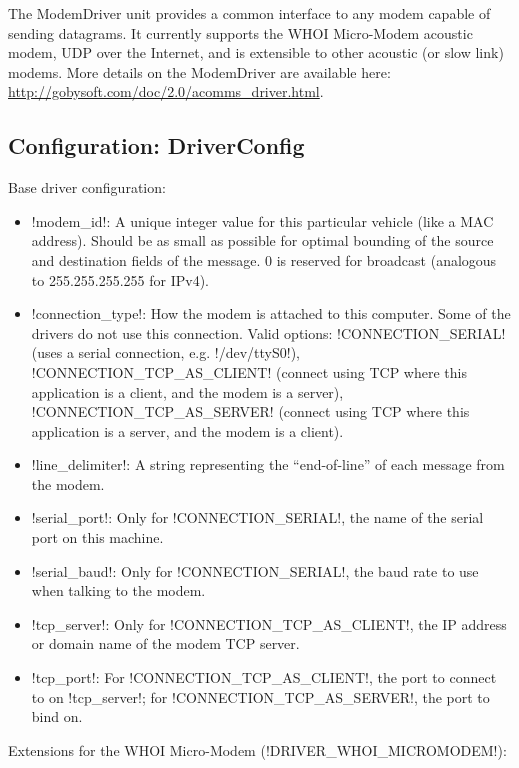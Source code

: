The ModemDriver unit provides a common interface to any modem capable of sending datagrams. It currently supports the WHOI Micro-Modem acoustic modem, UDP over the Internet, and is extensible to other acoustic (or slow link) modems. More details on the ModemDriver are available here: \url{http://gobysoft.com/doc/2.0/acomms_driver.html}.

\subsection{Configuration: DriverConfig}

Base driver configuration:

\resetbvlinenumber

\begin{itemize}
\item !modem_id!: A unique integer value for this particular vehicle (like a MAC address). Should be as small as possible for optimal bounding of the source and destination fields of the message. 0 is reserved for broadcast (analogous to 255.255.255.255 for IPv4).
\item !connection_type!: How the modem is attached to this computer. Some of the drivers do not use this connection. Valid options: !CONNECTION_SERIAL! (uses a serial connection, e.g. !/dev/ttyS0!), !CONNECTION_TCP_AS_CLIENT! (connect using TCP where this application is a client, and the modem is a server), !CONNECTION_TCP_AS_SERVER! (connect using TCP where this application is a server, and the modem is a client).
\item !line_delimiter!: A string representing the ``end-of-line'' of each message from the modem.
\item !serial_port!: Only for !CONNECTION_SERIAL!, the name of the serial port on this machine.
\item !serial_baud!: Only for !CONNECTION_SERIAL!, the baud rate to use when talking to the modem.
\item !tcp_server!: Only for !CONNECTION_TCP_AS_CLIENT!, the IP address or domain name of the modem TCP server.
\item !tcp_port!: For !CONNECTION_TCP_AS_CLIENT!, the port to connect to on !tcp_server!; for !CONNECTION_TCP_AS_SERVER!, the port to bind on.
\end{itemize} 

Extensions for the WHOI Micro-Modem (!DRIVER_WHOI_MICROMODEM!):
\resetbvlinenumber

